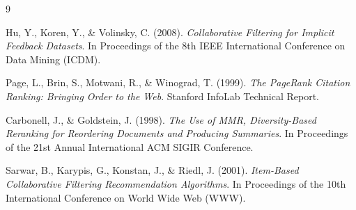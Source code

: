 \documentclass[11pt,a4paper]{article}
\begin{document}
\begin{thebibliography}{9}

Hu, Y., Koren, Y., \& Volinsky, C. (2008).
\textit{Collaborative Filtering for Implicit Feedback Datasets}.
In Proceedings of the 8th IEEE International Conference on Data Mining (ICDM).

Page, L., Brin, S., Motwani, R., \& Winograd, T. (1999).
\textit{The PageRank Citation Ranking: Bringing Order to the Web}.
Stanford InfoLab Technical Report.

Carbonell, J., \& Goldstein, J. (1998).
\textit{The Use of MMR, Diversity-Based Reranking for Reordering Documents and Producing Summaries}.
In Proceedings of the 21st Annual International ACM SIGIR Conference.

Sarwar, B., Karypis, G., Konstan, J., \& Riedl, J. (2001).
\textit{Item-Based Collaborative Filtering Recommendation Algorithms}.
In Proceedings of the 10th International Conference on World Wide Web (WWW).

\end{thebibliography}
\end{document}
